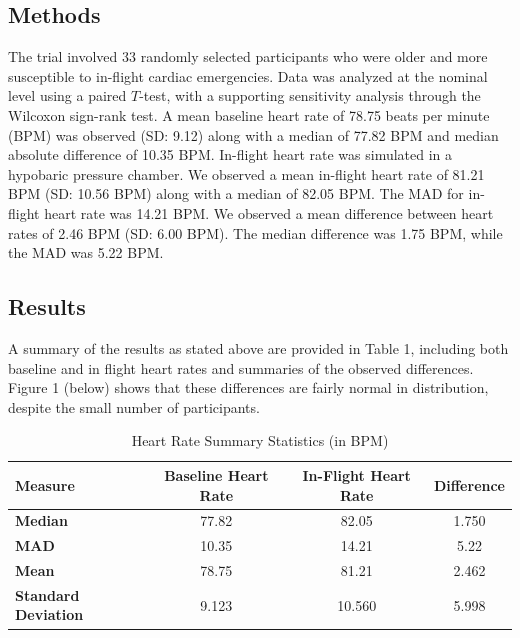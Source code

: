 \documentclass{article}
\begin{document}
\begin{enumerate}
		\subsection*{Methods}

		The trial involved 33 randomly selected participants who were older and more susceptible to in-flight cardiac emergencies. Data was analyzed at the nominal level using a paired $T$-test, with a supporting sensitivity analysis through the Wilcoxon sign-rank test. A mean baseline heart rate of 78.75 beats per minute (BPM) was observed (SD: 9.12) along with a median of 77.82 BPM and median absolute difference of 10.35 BPM. In-flight heart rate was simulated in a hypobaric pressure chamber. We observed a mean in-flight heart rate of 81.21 BPM (SD: 10.56 BPM) along with a median of 82.05 BPM. The MAD for in-flight heart rate was 14.21 BPM. We observed a mean difference between heart rates of 2.46 BPM (SD: 6.00 BPM). The median difference was 1.75 BPM, while the MAD was 5.22 BPM.

		\subsection*{Results}

		A summary of the results as stated above are provided in Table 1, including both baseline and in flight heart rates and summaries of the observed differences. Figure 1 (below) shows that these differences are fairly normal in distribution, despite the small number of participants.

		\begin{table}[h!]
			\centering
			\footnotesize
			\caption{Heart Rate Summary Statistics (in BPM)}
			\label{tab:heart_rate_summary}
			\begin{tabular}{lccc}
			\toprule
			\textbf{Measure}         & \textbf{Baseline Heart Rate} & \textbf{In-Flight Heart Rate} & \textbf{Difference} \\ 
			\midrule
			\textbf{Median}          & 77.82                        & 82.05                         & 1.750               \\ 
			\textbf{MAD}             & 10.35                        & 14.21                         & 5.22                \\ 
			\textbf{Mean}            & 78.75                        & 81.21                         & 2.462               \\ 
			\textbf{Standard Deviation} & 9.123                      & 10.560                        & 5.998               \\ 
			\bottomrule
			\end{tabular}
			\end{table}


\end{enumerate}
\end{document}
